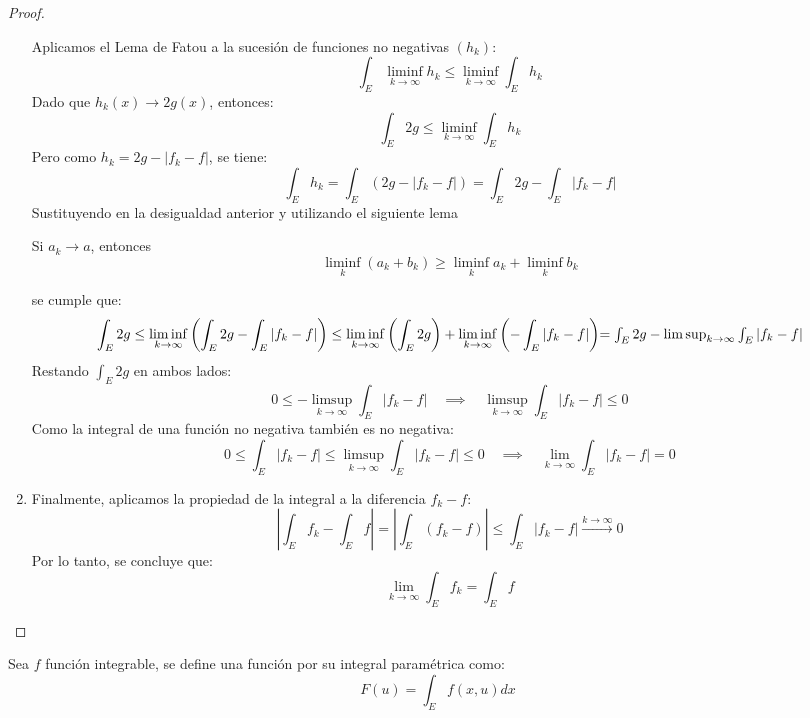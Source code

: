 \begin{proof}
\begin{enumerate}
              Aplicamos el Lema de Fatou a la sucesión de funciones no negativas $(h_k)$:
              \[
                  \int_E \liminf_{k \to \infty} h_k \leq \liminf_{k \to \infty} \int_E h_k
              \]
              Dado que $h_k(x) \to 2g(x)$, entonces:
              \[
                  \int_E 2g \leq \liminf_{k \to \infty} \int_E h_k
              \]
              Pero como $h_k = 2g - |f_k - f|$, se tiene:
              \[
                  \int_E h_k = \int_E (2g - |f_k - f|) = \int_E 2g - \int_E |f_k - f|
              \]
              Sustituyendo en la desigualdad anterior y utilizando el siguiente lema
              \begin{lema}
                  Si \( a_k \to a \), entonces
                  \[
                      \liminf_k (a_k + b_k) \geq \liminf_k a_k + \liminf_k b_k
                  \]
              \end{lema}
              se cumple que:
              \[
                  \int_E 2g \leq \liminf_{k \to \infty} \left( \int_E 2g - \int_E |f_k - f| \right)
                  \leq \liminf_{k \to \infty} \left(\int_E 2g\right) + \liminf_{k \to \infty} \left(-\int_E |f_k - f|\right)$$
              $$= \int_E 2g - \limsup_{k \to \infty} \int_E |f_k - f|
              \]
              Restando $\int_E 2g$ en ambos lados:
              \[
                  0 \leq - \limsup_{k \to \infty} \int_E |f_k - f| \quad \implies \quad \limsup_{k \to \infty} \int_E |f_k - f| \leq 0
              \]
              Como la integral de una función no negativa también es no negativa:
              \[
                  0 \leq \int_E |f_k - f| \leq \limsup_{k \to \infty} \int_E |f_k - f| \leq 0 \quad \implies \quad \lim_{k \to \infty} \int_E |f_k - f| = 0
              \]
        \item Finalmente, aplicamos la propiedad de la integral a la diferencia \( f_k - f
              \):
              \[
                  \left| \int_E f_k - \int_E f \right| = \left| \int_E (f_k - f) \right| \leq \int_E |f_k - f| \xrightarrow{k \to \infty} 0
              \]
              Por lo tanto, se concluye que:
              \[
                  \lim_{k \to \infty} \int_E f_k = \int_E f
              \]
    \end{enumerate}
\end{proof}
\begin{definición}
Sea $f$ función integrable, se define una función por su integral paramétrica como:
$$ F(u) = \int_{E}f(x, u)dx$$
\end{definición}

